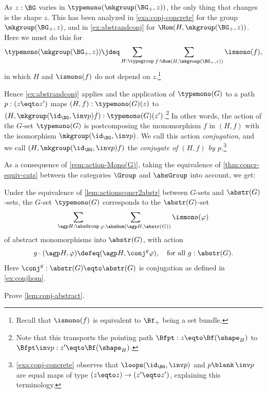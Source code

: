 \begin{remark}\label{rem:action-Mono(G)}
As $z:\BG$ varies in $\typemono(\mkgroup(\BG_\div,z))$, the only thing that changes is the shape $z$. This has been analyzed in 
\cref{exa:conj-concrete} for the group $\mkgroup(\BG_\div,z)$,
and in \cref{ex:abstrandconj} for $\Hom(H,\mkgroup(\BG_\div,z))$.
Here we must do this for 
\[
\typemono(\mkgroup(\BG_\div,z))\jdeq
\sum_{H:\typegroup}\sum_{f:\Hom(H,\mkgroup(\BG_\div,z))}\ismono(f),
\]
in which $H$ and $\ismono(f)$ do not depend on $z$.\footnote{Recall
that $\ismono(f)$ is equivalent to $\Bf_\div$ being a set bundle.}

Hence \cref{ex:abstrandconj} applies and the application of 
$\typemono(G)$ to a path $p: (z\eqto z')$ maps $(H,f):\typemono(G)(z)$ to 
$(H,\mkgroup(\id_\BG,\inv p) f):\typemono(G)(z')$.\footnote{%
Note that this transports the pointing path $\Bfpt:z\eqto\Bf(\sh_H)$ 
to $\Bfpt\inv p:z'\eqto\Bf(\sh_H)$.}
In other words, the action of the $G$-set $\typemono(G)$ is 
postcomposing the monomorphism $f$ in $(H,f)$ with the isomorphism 
$\mkgroup(\id_\BG,\inv p)$. We call this action \emph{conjugation},
and we call $(H,\mkgroup(\id_\BG,\inv p) f)$ the \emph{conjugate of $(H,f)$ 
by $p$.}\footnote{\cref{exa:conj-concrete} observes that
$\loops(\id_\BG,\inv p)$ and $p\blank\,\inv p$ are equal maps
of type $(z\eqto z)\to(z'\eqto z')$,
explaining this terminology.}
\end{remark}

As a consequence of \cref{rem:action-Mono(G)}, taking the equivalence
of \cref{thm:concr-equiv-cats} between the categories $\Group$ and
$\absGroup$ into account, we get:
\begin{lemma}\label{lem:conj-abstract}
Under the equivalence of \cref{lem:actionsconcr2abstr} between $G$-sets and 
$\abstr(G)$-sets, the $G$-set $\typemono(G)$ corresponds to the $\abstr(G)$-set
\[
\sum_{\agp H:\absGroup}\sum_{\varphi:\absHom(\agp H,\abstr(G))}\ismono(\varphi)
\]
of abstract monomorphisms into $\abstr(G)$, with action 
\[
g\cdot(\agp H,\varphi)\defeq(\agp H,\conj^g \varphi),\quad
\text{for all $g:\abstr(G)$.}
\]
Here  $\conj^g:\abstr(G)\eqto \abstr(G)$ is conjugation 
as defined in \cref{ex:conjhom}.
\end{lemma}

\begin{xca}\label{xca:conj-abstract}
Prove \cref{lem:conj-abstract}.
\end{xca}

